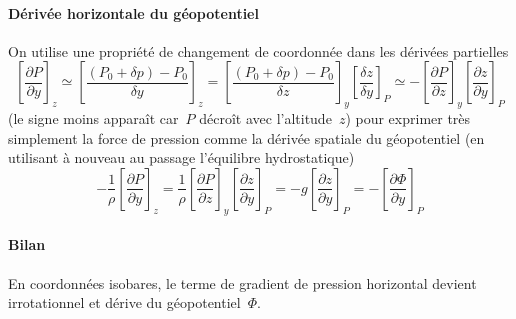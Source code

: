 \sk
\paragraph{Dérivée horizontale du géopotentiel} On utilise une propriété de changement de coordonnée dans les dérivées partielles
\[ 
\left[ \frac{\partial P}{\partial y} \right]_z
\simeq
\left[ \frac{(P_0 + \delta p) - P_0}{\delta y} \right]_z 
=
\left[ \frac{(P_0 + \delta p) - P_0}{\delta z} \right]_y
\left[ \frac{\delta z}{\delta y} \right]_P
\simeq
-\left[ \frac{\partial P}{\partial z} \right]_y \left[ \frac{\partial z}{\partial y} \right]_P
\]
(le signe moins apparaît car~$P$ décroît avec l'altitude~$z$) pour exprimer très simplement la force de pression comme la dérivée spatiale du géopotentiel (en utilisant à nouveau au passage l'équilibre hydrostatique)
\[ -\frac{1}{\rho} \left[ \frac{\partial P}{\partial y} \right]_z
= \frac{1}{\rho} \left[ \frac{\partial P}{\partial z} \right]_y \left[ \frac{\partial z}{\partial y} \right]_P
= -g \left[ \frac{\partial z}{\partial y} \right]_P
= -\left[ \frac{\partial \Phi}{\partial y} \right]_P
\]

\sk
\paragraph{Bilan} En coordonnées isobares, 
le terme de gradient de pression horizontal devient irrotationnel
et dérive du géopotentiel~$\Phi$.
